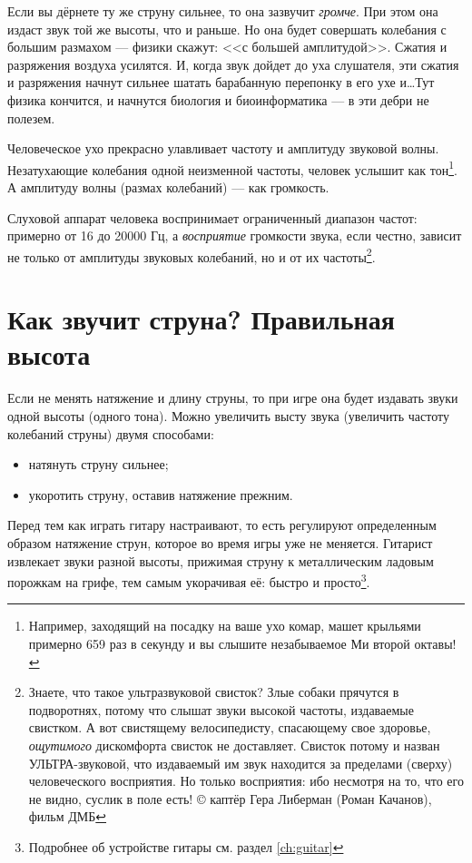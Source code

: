 Если вы дёрнете ту же струну сильнее, то она зазвучит \emph{громче}. При этом она издаст звук той же высоты, что и раньше. Но она будет совершать колебания с большим размахом --- физики скажут: <<с большей амплитудой>>. Сжатия и разряжения воздуха усилятся. И, когда звук дойдет до уха слушателя, эти сжатия и разряжения начнут сильнее шатать барабанную перепонку в его ухе и\ldots Тут физика кончится, и начнутся биология и биоинформатика --- в эти дебри не полезем.

Человеческое ухо прекрасно улавливает частоту и амплитуду звуковой волны. Незатухающие колебания одной неизменной частоты, человек услышит как тон\footnote{Например, заходящий на посадку на ваше ухо комар, машет крыльями примерно 659 раз в секунду и вы слышите незабываемое Ми второй октавы!}. А амплитуду волны (размах колебаний) --- как громкость. 

Слуховой аппарат человека воспринимает ограниченный диапазон частот: примерно от 16 до 20000 Гц, а \emph{восприятие} громкости звука, если честно, зависит не только от амплитуды звуковых колебаний, но и от их частоты\footnote{Знаете, что такое ультразвуковой свисток? Злые собаки прячутся в подворотнях, потому что слышат звуки высокой частоты, издаваемые свистком. А вот свистящему велосипедисту, спасающему свое здоровье, \emph{ощутимого} дискомфорта свисток не доставляет.  Свисток потому и назван УЛЬТРА-звуковой, что издаваемый им звук находится за пределами (сверху) человеческого восприятия. Но только восприятия: ибо несмотря на то, что его не видно, суслик в поле есть! {\copyright} каптёр Гера Либерман (Роман Качанов), фильм ДМБ}. 


\section{Как звучит струна? Правильная высота}
\label{ch:music:tone}

Если не менять натяжение и длину струны, то при игре она будет издавать звуки одной высоты (одного тона). Можно увеличить высту звука (увеличить частоту колебаний струны) двумя способами:
\begin{itemize}
    \item натянуть струну сильнее;
    \item укоротить струну, оставив натяжение прежним.
\end{itemize}

Перед тем как играть гитару настраивают, то есть регулируют определенным образом натяжение струн, которое во время игры уже не меняется. Гитарист извлекает звуки разной высоты, прижимая струну к металлическим ладовым порожкам на грифе, тем самым укорачивая её: быстро и просто\footnote{Подробнее об устройстве гитары см. раздел \ref{ch:guitar}}.

